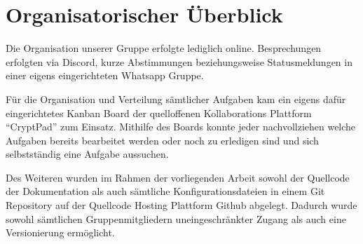 \section{Organisatorischer Überblick}

Die Organisation unserer Gruppe erfolgte lediglich online. Besprechungen erfolgten via Discord, kurze Abstimmungen beziehungsweise Statusmeldungen in einer eigens eingerichteten Whatsapp Gruppe.

Für die Organisation und Verteilung sämtlicher Aufgaben kam ein eigens dafür eingerichtetes Kanban Board der quelloffenen Kollaborations Plattform \enquote{CryptPad} zum Einsatz. Mithilfe des Boards konnte jeder nachvollziehen welche Aufgaben bereits bearbeitet werden oder noch zu erledigen sind und sich selbstständig eine Aufgabe aussuchen.

Des Weiteren wurden im Rahmen der vorliegenden Arbeit sowohl der Quellcode der Dokumentation als auch sämtliche Konfigurationsdateien in einem Git Repository auf der Quellcode Hosting Plattform Github abgelegt. Dadurch wurde sowohl sämtlichen Gruppenmitgliedern uneingeschränkter Zugang als auch eine Versionierung ermöglicht.